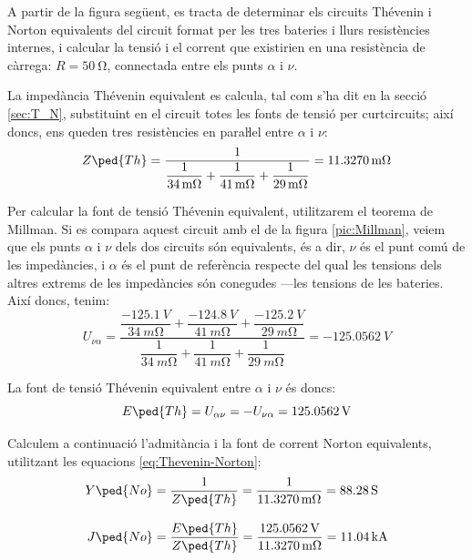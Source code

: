 \begin{exemple}\label{ex:MillmanBateries}
	\addcontentsxms{\MillmanBateries}
    A partir de la figura següent, es tracta de determinar els circuits
    Thévenin i Norton equivalents del circuit format per les tres
    bateries i llurs resistències internes, i calcular la tensió i el
    corrent que existirien en una resistència de càrrega:
    $R=\qty{50}{\ohm}$, connectada entre els punts $\alpha$
    i $\nu$.

    \begin{center}
        
    \end{center}

    La impedància Thévenin equivalent es calcula, tal com s'ha dit en la secció \ref{sec:T_N},
    substituint en el circuit totes les fonts de tensió per curtcircuits; així doncs, ens
    queden tres resistències en paraŀlel entre $\alpha$ i $\nu$:
    \[
    Z\ped{Th} = \frac{1}{\dfrac{1}{\qty{34}{\milli\ohm}} +
    \dfrac{1}{\qty{41}{\milli\ohm}} + \dfrac{1}{\qty{29}{\milli\ohm}}} =
    \qty{11,3270}{\milli\ohm}
    \]

    Per calcular la font de tensió Thévenin equivalent, utilitzarem el
    teorema de Millman. Si es compara aquest circuit amb el de la figura
    \vref{pic:Millman}, veiem que els punts $\alpha$ i $\nu$ dels dos
    circuits són equivalents, és a dir, $\nu$ és el punt comú de les
    impedàncies, i $\alpha$ és el punt de referència respecte del qual les tensions  dels altres extrems de les impedàncies
    són conegudes ---les tensions de les bateries. Així doncs, tenim:
    \[
    U_{\nu\alpha} = \frac{\dfrac{\qty{-125,1}{V}}{\qty{34}{m\ohm}} +
    \dfrac{\qty{-124,8}{V}}{\qty{41}{m\ohm}} +
    \dfrac{\qty{-125,2}{V}}{\qty{29}{m\ohm}}}{\dfrac{1}{\qty{34}{m\ohm}}
    + \dfrac{1}{\qty{41}{m\ohm}} + \dfrac{1}{\qty{29}{m\ohm}}} =
    \qty{-125,0562}{V}
    \]

    La font de tensió  Thévenin equivalent entre $\alpha$ i $\nu$ és doncs:
    \[
    E\ped{Th} = U_{\alpha\nu} = -U_{\nu\alpha} = \qty{125,0562}{V}
    \]

    Calculem a continuació l'admitància i la font de corrent  Norton equivalents, utilitzant
    les equacions \eqref{eq:Thevenin-Norton}:
    \begin{align*}
        Y\ped{No} &= \frac{1}{Z\ped{Th}} = \frac{1}{\qty{11,3270}{m\ohm}} = \qty{88,28}{S}
        \\[2ex]
        J\ped{No} &= \frac{E\ped{Th}}{Z\ped{Th}} =
        \frac{\qty{125,0562}{V}}{\qty{11,3270}{m\ohm}}= \qty{11,04}{kA}
    \end{align*}


\end{exemple}
